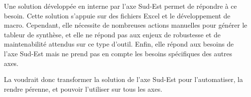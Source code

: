Une solution développée en interne par l'axe Sud-Est permet de répondre à ce besoin.
Cette solution s'appuie sur des fichiers Excel et le développement de macro.
Cependant, elle nécessite de nombreuses actions manuelles pour générer le tableur de synthèse, et elle ne répond pas aux enjeux de robustesse et de maintenabilité attendus sur ce type d'outil.
Enfin, elle répond aux besoins de l'axe Sud-Est mais ne prend pas en compte les besoins spécifiques des autres axes.

La \sncf voudrait donc transformer la solution de l'axe Sud-Est pour l'automatiser, la rendre pérenne, et pouvoir l'utiliser sur tous les axes.





